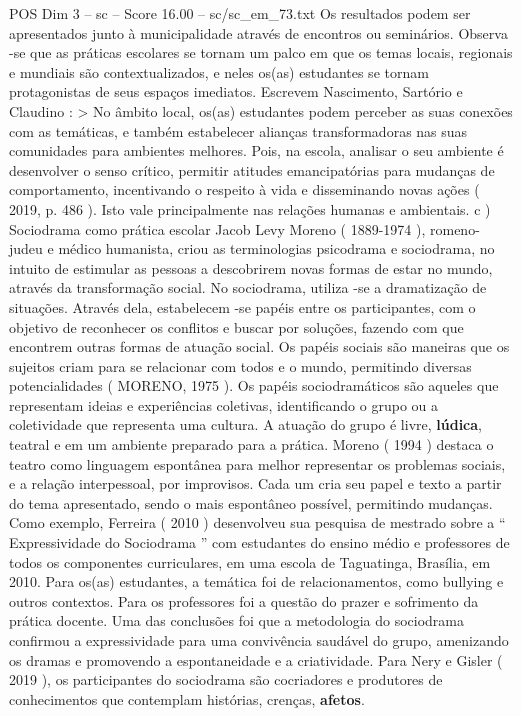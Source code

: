 \begin{textsample}{POS Dim 3 – sc – Score 16.00 – sc/sc\_em\_73.txt}
Os resultados podem ser apresentados junto à municipalidade através de encontros ou seminários.
Observa -se que as práticas escolares se tornam um palco em que os temas locais, regionais e mundiais são contextualizados, e neles os(as) estudantes se tornam protagonistas de seus espaços imediatos.
Escrevem Nascimento, Sartório e Claudino : > No âmbito local, os(as) estudantes podem perceber as suas conexões com as temáticas, e também estabelecer alianças transformadoras nas suas comunidades para ambientes melhores.
Pois, na escola, analisar o seu ambiente é desenvolver o senso crítico, permitir atitudes emancipatórias para mudanças de comportamento, incentivando o respeito à vida e disseminando novas ações ( 2019, p. 486 ).
Isto vale principalmente nas relações humanas e ambientais. c ) Sociodrama como prática escolar Jacob Levy Moreno ( 1889-1974 ), romeno-judeu e médico humanista, criou as terminologias psicodrama e sociodrama, no intuito de estimular as pessoas a descobrirem novas formas de estar no mundo, através da transformação social.
No sociodrama, utiliza -se a dramatização de situações.
Através dela, estabelecem -se papéis entre os participantes, com o objetivo de reconhecer os conflitos e buscar por soluções, fazendo com que encontrem outras formas de atuação social.
Os papéis sociais são maneiras que os sujeitos criam para se relacionar com todos e o mundo, permitindo diversas potencialidades ( MORENO, 1975 ).
Os papéis sociodramáticos são aqueles que representam ideias e experiências coletivas, identificando o grupo ou a coletividade que representa uma cultura.
A atuação do grupo é livre, \textbf{lúdica}, teatral e em um ambiente preparado para a prática.
Moreno ( 1994 ) destaca o teatro como linguagem espontânea para melhor representar os problemas sociais, e a relação interpessoal, por improvisos.
Cada um cria seu papel e texto a partir do tema apresentado, sendo o mais espontâneo possível, permitindo mudanças.
Como exemplo, Ferreira ( 2010 ) desenvolveu sua pesquisa de mestrado sobre a “ Expressividade do Sociodrama ” com estudantes do ensino médio e professores de todos os componentes curriculares, em uma escola de Taguatinga, Brasília, em 2010.
Para os(as) estudantes, a temática foi de relacionamentos, como bullying e outros contextos.
Para os professores foi a questão do prazer e sofrimento da prática docente.
Uma das conclusões foi que a metodologia do sociodrama confirmou a expressividade para uma convivência saudável do grupo, amenizando os dramas e promovendo a espontaneidade e a criatividade.
Para Nery e Gisler ( 2019 ), os participantes do sociodrama são cocriadores e produtores de conhecimentos que contemplam histórias, crenças, \textbf{afetos}.

\end{textsample}
